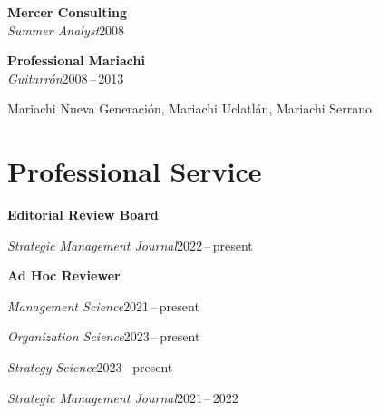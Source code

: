 \documentclass[11pt]{article}
\newcommand{\job}[4]{\needspace{5\baselineskip}\textbf{#1}\hfill #2\\\textit{#3}\hfill #4\par}
\newcommand{\lr}[2]{#1\hfill #2\par}
\newcommand{\SMJ}{\textit{Strategic Management Journal}}
\begin{document}
\job{Mercer Consulting}{}{Summer Analyst}{2008}
\vspace{7pt}

\job{Professional Mariachi}{}{Guitarrón}{2008\,--\,2013}
Mariachi Nueva Generación, Mariachi Uclatlán, Mariachi Serrano\par

\section*{Professional Service}

\textbf{Editorial Review Board}\par
\lr{\SMJ}{2022\,--\,present}
\vspace{7pt}

\textbf{Ad Hoc Reviewer}\par
\lr{\textit{Management Science}}{2021\,--\,present}
\lr{\textit{Organization Science}}{2023\,--\,present}
\lr{\textit{Strategy Science}}{2023\,--\,present}
\lr{\SMJ}{2021\,--\,2022}
\end{document}
